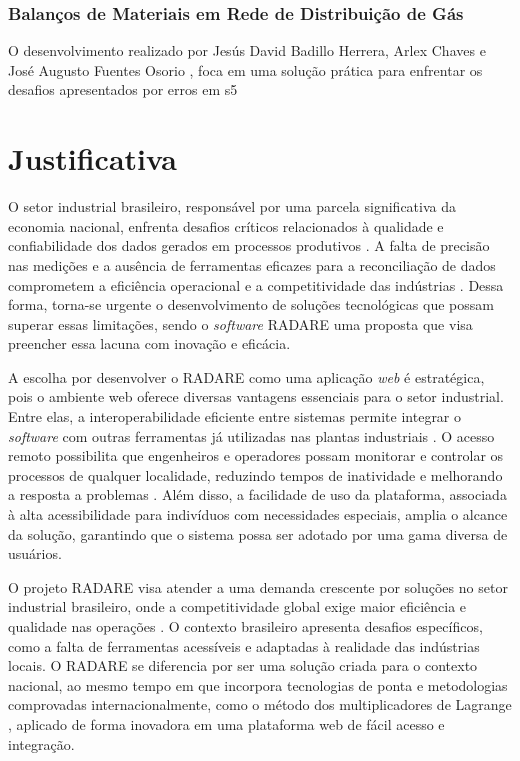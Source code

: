 \subsubsection{Balanços de Materiais em Rede de Distribuição de Gás}

O desenvolvimento realizado por Jesús David Badillo Herrera, Arlex Chaves e José Augusto Fuentes Osorio \cite{datareconherrera}, foca em uma solução prática para enfrentar os desafios apresentados por erros em s5
\section{Justificativa}

O setor industrial brasileiro, responsável por uma parcela significativa da economia nacional, enfrenta desafios críticos relacionados à qualidade e confiabilidade dos dados gerados em processos produtivos \cite{govbr}. A falta de precisão nas medições e a ausência de ferramentas eficazes para a reconciliação de dados comprometem a eficiência operacional e a competitividade das indústrias \cite{cni2024}. Dessa forma, torna-se urgente o desenvolvimento de soluções tecnológicas que possam superar essas limitações, sendo o \textit{software} RADARE uma proposta que visa preencher essa lacuna com inovação e eficácia.

A escolha por desenvolver o RADARE como uma aplicação \textit{web} é estratégica, pois o ambiente web oferece diversas vantagens essenciais para o setor industrial. Entre elas, a interoperabilidade eficiente entre sistemas permite integrar o \textit{software} com outras ferramentas já utilizadas nas plantas industriais \cite{apiimportance}. O acesso remoto possibilita que engenheiros e operadores possam monitorar e controlar os processos de qualquer localidade, reduzindo tempos de inatividade e melhorando a resposta a problemas \cite{webusage}. Além disso, a facilidade de uso da plataforma, associada à alta acessibilidade para indivíduos com necessidades especiais, amplia o alcance da solução, garantindo que o sistema possa ser adotado por uma gama diversa de usuários.

O projeto RADARE visa atender a uma demanda crescente por soluções no setor industrial brasileiro, onde a competitividade global exige maior eficiência e qualidade nas operações \cite{govbr}. O contexto brasileiro apresenta desafios específicos, como a falta de ferramentas acessíveis e adaptadas à realidade das indústrias locais. O RADARE se diferencia por ser uma solução criada para o contexto nacional, ao mesmo tempo em que incorpora tecnologias de ponta e metodologias comprovadas internacionalmente, como o método dos multiplicadores de Lagrange \cite{lagrangebio}, aplicado de forma inovadora em uma plataforma web de fácil acesso e integração.

